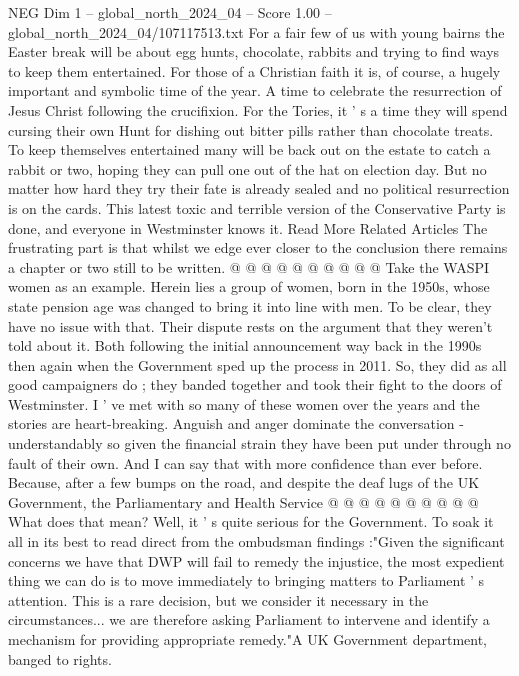 \begin{textsample}{NEG Dim 1 – global\_north\_2024\_04 – Score 1.00 – global\_north\_2024\_04/107117513.txt}  \label{ex:f1_neg_299}
For a fair few of us with young bairns the Easter break will be about egg hunts, chocolate, rabbits and trying to find ways to keep them entertained.
For those of a Christian faith it is, of course, a hugely important and symbolic time of the year.
A time to celebrate the resurrection of Jesus Christ following the crucifixion.
For the Tories, it ' s a time they will spend cursing their own Hunt for dishing out bitter pills rather than chocolate treats.
To keep themselves entertained many will be back out on the estate to catch a rabbit or two, hoping they can pull one out of the hat on election day.
But no matter how hard they try their fate is already sealed and no political resurrection is on the cards.
This latest toxic and terrible version of the Conservative Party is done, and everyone in Westminster knows it.
Read More Related Articles The frustrating part is that whilst we edge ever closer to the conclusion there remains a chapter or two still to be written. @ @ @ @ @ @ @ @ @ @ Take the WASPI women as an example.
Herein lies a group of women, born in the 1950s, whose state pension age was changed to bring it into line with men.
To be clear, they have no issue with that.
Their dispute rests on the argument that they weren't told about it.
Both following the initial announcement way back in the 1990s then again when the Government sped up the process in 2011.
So, they did as all good campaigners do ; they banded together and took their fight to the doors of Westminster.
I ' ve met with so many of these women over the years and the stories are heart-breaking.
Anguish and anger dominate the conversation - understandably so given the financial strain they have been put under through no fault of their own.
And I can say that with more confidence than ever before.
Because, after a few bumps on the road, and despite the deaf lugs of the UK Government, the Parliamentary and Health Service @ @ @ @ @ @ @ @ @ @ What does that mean?
Well, it ' s quite serious for the Government.
To soak it all in its best to read direct from the ombudsman findings :"Given the significant concerns we have that DWP will fail to remedy the injustice, the most expedient thing we can do is to move immediately to bringing matters to Parliament ' s attention.
This is a rare decision, but we consider it necessary in the circumstances... we are therefore asking Parliament to intervene and identify a mechanism for providing appropriate remedy."A UK Government department, banged to rights.

\end{textsample}
